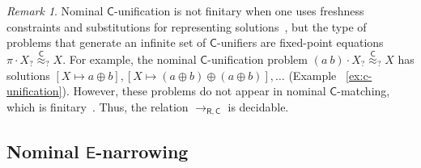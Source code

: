 \documentclass[submission,copyright,creativecommons]{eptcs}
\newcommand{\daniele}[1]{\textcolor{cyan}{#1}}
\newcommand{\theory}[1]{\ensuremath{\mathsf{#1}}}
\theoremstyle{plain}
\theoremstyle{definition}
\theoremstyle{remark}
\newtheorem{remark}[theorem]{Remark}
\begin{document}
    

\begin{remark}\label{rmk:cunif-notfin}
Nominal $\theory{C}$-unification is not finitary when one uses freshness constraints and substitutions for representing solutions~\cite{OnSolvingNomFPequations/frocos/Washington17}, but the type of problems that generate an infinite set of $\theory{C}$-unifiers are fixed-point equations $\pi\cdot X _?{\overset{\theory{C}}{\approx}}_?  X$. For example, the nominal \theory{C}-unification problem $(a \ b)\cdot X _?{\overset{\theory{C}}{\approx}}_?  X$  has solutions $[X\mapsto a\oplus b], [X\mapsto (a\oplus b)\oplus (a \oplus b)],\ldots$ (Example~ \ref{ex:c-unification}). However, these problems do not appear in nominal $\theory{C}$-matching, which is finitary~\cite{AFormalisationofNomCmatching/entcs/Ayala-RinconSFN19}. Thus, the relation $\to_{\theory{R,C}}$ is decidable. %
\end{remark}





\subsection{Nominal \theory{E}-narrowing}
\end{document}
